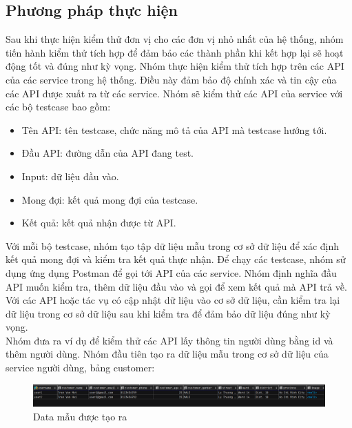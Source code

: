 \subsection{Phương pháp thực hiện}

Sau khi thực hiện kiểm thử đơn vị cho các đơn vị nhỏ nhất của hệ thống, nhóm tiến hành kiểm thử tích hợp để đảm bảo các thành phần khi kết hợp lại sẽ hoạt động tốt và đúng như kỳ vọng. Nhóm thực hiện kiểm thử tích hợp trên các API của các service trong hệ thống. Điều này đảm bảo độ chính xác và tin cậy của các API được xuất ra từ các service. Nhóm sẽ kiểm thử các API của service với các bộ testcase bao gồm:
\begin{itemize}
    \item Tên API: tên testcase, chức năng mô tả của API mà testcase hướng tới.
    \item Đầu API: đường dẫn của API đang test.
    \item Input: dữ liệu đầu vào.
    \item Mong đợi: kết quả mong đợi của testcase.
    \item Kết quả: kết quả nhận được từ API.
\end{itemize}

Với mỗi bộ testcase, nhóm tạo tập dữ liệu mẫu trong cơ sở dữ liệu để xác định kết quả mong đợi và kiểm tra kết quả thực nhận. Để chạy các testcase, nhóm sử dụng ứng dụng Postman để gọi tới API của các service. Nhóm định nghĩa đầu API muốn kiểm tra, thêm dữ liệu đầu vào và gọi để xem kết quả mà API trả về. Với các API hoặc tác vụ có cập nhật dữ liệu vào cơ sở dữ liệu, cần kiểm tra lại dữ liệu trong cơ sở dữ liệu sau khi kiểm tra để đảm bảo dữ liệu đúng như kỳ vọng.\\

Nhóm đưa ra ví dụ để kiểm thử các API lấy thông tin người dùng bằng id và thêm người dùng. Nhóm đầu tiên tạo ra dữ liệu mẫu trong cơ sở dữ liệu của service người dùng, bảng customer:



\begin{figure}[!htp]
    \begin{center}
        \includegraphics[width=15cm]{img/testing/sample_db.PNG}
    \end{center}
    \caption{Data mẫu được tạo ra}
\end{figure}

